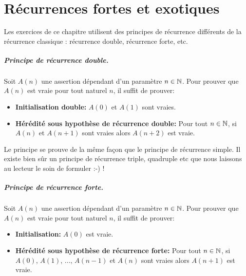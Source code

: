 



\chapter{Récurrences fortes et exotiques}

Les exercices de ce chapitre utilisent des principes de récurrence différents de la récurrence classique : récurrence double, récurrence forte, etc. 

\begin{mdframed}
\paragraph{Principe de récurrence double.} Soit $A(n)$ une assertion dépendant d'un paramètre $n\in \mathbb N$. Pour prouver que $A(n)$ est vraie pour tout naturel $n$, il suffit de prouver:
\begin{itemize}
\item \textbf{Initialisation double:} $A(0)$ et $A(1)$ sont vraies.
\item \textbf{Hérédité sous hypothèse de récurrence double:} Pour tout $n\in \mathbb N$, si $A(n)$ et $A(n+1)$ sont vraies alors $A(n+2)$ est vraie.\\
\end{itemize}
\end{mdframed}

Le principe se prouve de la même façon que le principe de récurrence simple. Il existe bien sûr un principe de récurrence triple, quadruple etc que nous laissons au lecteur le soin de formuler :-) !

\begin{mdframed}
\paragraph{Principe de récurrence forte.} Soit $A(n)$ une assertion dépendant d'un paramètre $n\in \mathbb N$. Pour prouver que $A(n)$ est vraie pour tout naturel $n$, il suffit de prouver:
\begin{itemize}
\item \textbf{Initialisation:} $A(0)$ est vraie.
\item \textbf{Hérédité sous hypothèse de récurrence forte:} Pour tout $n\in \mathbb N$, si $A(0)$, $A(1)$, ..., $A(n-1)$ et $A(n)$ sont vraies alors $A(n+1)$ est vraie.\\
\end{itemize}
\end{mdframed}

